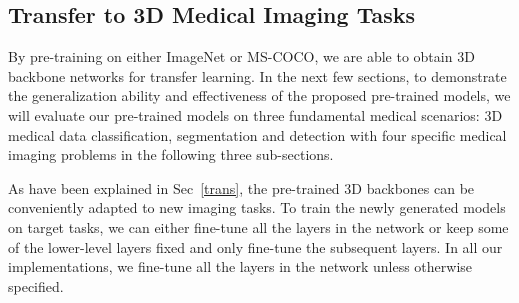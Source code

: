 \documentclass[journal,twoside,web]{ieeecolor}
\begin{document}
\begin{table}\centering
    \setlength{\belowcaptionskip}{5pt}
    \caption{Dice coefficient on LIDC-IDRI segmentation task. Results are given as  format.}
    \label{LIDC-SEG}
    \footnotesize
\end{table}

\subsection{Transfer to 3D Medical Imaging Tasks}

By pre-training on either ImageNet or MS-COCO, we are able to obtain 3D backbone networks for transfer learning. In the next few sections, to demonstrate the generalization ability and effectiveness of the proposed pre-trained models, we will evaluate our pre-trained models on three fundamental medical scenarios: 3D medical data classification, segmentation and detection with four specific medical imaging problems in the following three sub-sections.

As have been explained in Sec~\ref{trans}, the pre-trained 3D backbones can be conveniently adapted to new imaging tasks.
To train the newly generated models on target tasks, we can either fine-tune all the layers in the network or keep some of the lower-level layers fixed and only fine-tune the subsequent layers. In all our implementations, we fine-tune all the layers in the network unless otherwise specified.
\end{document}

